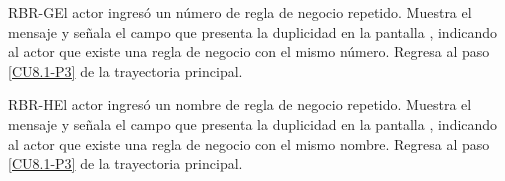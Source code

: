 	\begin{UCtrayectoriaA}{RBR-G}{El actor ingresó un número de regla de negocio repetido.}
		\UCpaso[\UCsist] Muestra el mensaje  y señala el campo que presenta la duplicidad en
		la pantalla , indicando al actor que existe una regla de negocio con el mismo número.
		\UCpaso Regresa al paso \ref{CU8.1-P3} de la trayectoria principal.
	\end{UCtrayectoriaA}
	
	\begin{UCtrayectoriaA}{RBR-H}{El actor ingresó un nombre de regla de negocio repetido.}
		\UCpaso[\UCsist] Muestra el mensaje  y señala el campo que presenta la duplicidad en la pantalla , indicando al actor que existe una regla de negocio con el mismo nombre.
		\UCpaso Regresa al paso \ref{CU8.1-P3} de la trayectoria principal.
	\end{UCtrayectoriaA}
